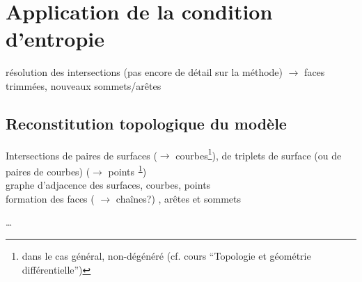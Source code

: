 \section{Application de la condition d'entropie}
résolution des intersections (pas encore de détail sur la méthode) $\to$ faces trimmées, nouveaux sommets/arêtes

\subsection{Reconstitution topologique du modèle \brep}
Intersections de paires de surfaces ($\to$ courbes\footnote{dans le cas général, non-dégénéré (cf. cours ``Topologie et géométrie différentielle'')\label{foot}}), de triplets de surface (ou de paires de courbes) ($\to$ points\textsuperscript{~\ref{foot}})\\
graphe d'adjacence des surfaces, courbes, points \cite[Chap. 4]{pentcheva2010}\\
formation des faces ( $\to$ chaînes?) \cite[Chap. 7]{pentcheva2010}, arêtes et sommets \cite[Chap. 5]{pentcheva2010}

\ldots
{}

\def\numim{2}%
\def\imw{80mm}
\def\imh{\imw}
\def\alp{0.2}
\def\heoffset{0.013}
\DTLsetseparator{ }%
%
%
\begin{figure}%
	\centering%
\end{figure}%

